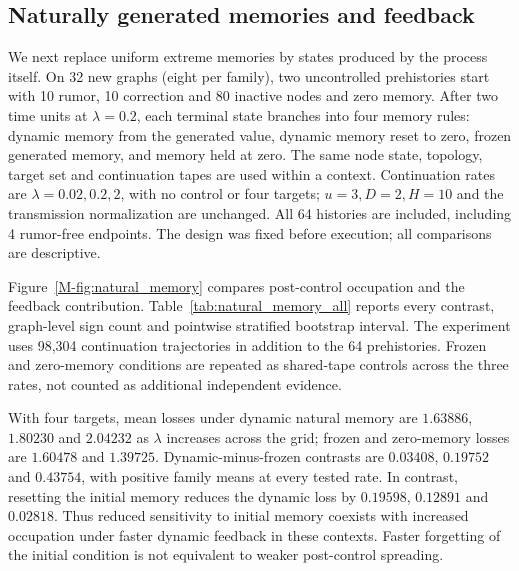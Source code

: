 \documentclass[preprint,11pt,sort&compress]{elsarticle}
\begin{document}
\subsection{Naturally generated memories and feedback}\label{sec:natural_memory}
We next replace uniform extreme memories by states produced by the process itself. On 32 new graphs (eight per family), two uncontrolled prehistories start with 10 rumor, 10 correction and 80 inactive nodes and zero memory. After two time units at $\lambda=0.2$, each terminal state branches into four memory rules: dynamic memory from the generated value, dynamic memory reset to zero, frozen generated memory, and memory held at zero. The same node state, topology, target set and continuation tapes are used within a context. Continuation rates are $\lambda=0.02,0.2,2$, with no control or four targets; $u=3,D=2,H=10$ and the transmission normalization are unchanged. All 64 histories are included, including 4 rumor-free endpoints. The design was fixed before execution; all comparisons are descriptive.

Figure~\ref{M-fig:natural_memory} compares post-control occupation and the feedback contribution. Table~\ref{tab:natural_memory_all} reports every contrast, graph-level sign count and pointwise stratified bootstrap interval. The experiment uses 98,304 continuation trajectories in addition to the 64 prehistories. Frozen and zero-memory conditions are repeated as shared-tape controls across the three rates, not counted as additional independent evidence.

With four targets, mean losses under dynamic natural memory are $1.63886$, $1.80230$ and $2.04232$ as $\lambda$ increases across the grid; frozen and zero-memory losses are $1.60478$ and $1.39725$. Dynamic-minus-frozen contrasts are $0.03408$, $0.19752$ and $0.43754$, with positive family means at every tested rate. In contrast, resetting the initial memory reduces the dynamic loss by $0.19598$, $0.12891$ and $0.02818$. Thus reduced sensitivity to initial memory coexists with increased occupation under faster dynamic feedback in these contexts. Faster forgetting of the initial condition is not equivalent to weaker post-control spreading.
\end{document}
